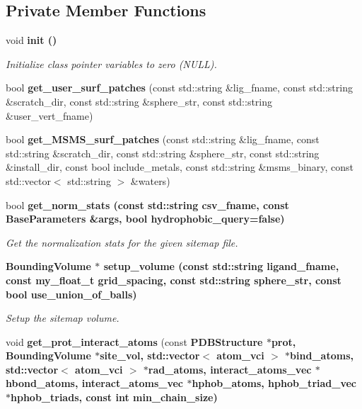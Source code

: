 \subsection*{Private Member Functions}
\begin{CompactItemize}
\item 
void \bf{init} ()\label{classSimSite3D_1_1Sitemap_2c579b022413645a8ecbdc4317117563}

\begin{CompactList}\small\item\em Initialize class pointer variables to zero (NULL). \item\end{CompactList}\item 
bool \textbf{get\_\-user\_\-surf\_\-patches} (const std::string \&lig\_\-fname, const std::string \&scratch\_\-dir, const std::string \&sphere\_\-str, const std::string \&user\_\-vert\_\-fname)\label{classSimSite3D_1_1Sitemap_bc73bf05cc0b7795b178657d537ab7d9}

\item 
bool \textbf{get\_\-MSMS\_\-surf\_\-patches} (const std::string \&lig\_\-fname, const std::string \&scratch\_\-dir, const std::string \&sphere\_\-str, const std::string \&install\_\-dir, const bool include\_\-metals, const std::string \&msms\_\-binary, const std::vector$<$ std::string $>$ \&waters)\label{classSimSite3D_1_1Sitemap_a35e5cc0fa7e11df3b9f5f237a01ab5c}

\item 
bool \bf{get\_\-norm\_\-stats} (const std::string csv\_\-fname, const \bf{Base\-Parameters} \&args, bool hydrophobic\_\-query=false)\label{classSimSite3D_1_1Sitemap_d692fc3eae9705af5c3b5151a18aad82}

\begin{CompactList}\small\item\em Get the normalization stats for the given sitemap file. \item\end{CompactList}\item 
\bf{Bounding\-Volume} $\ast$ \bf{setup\_\-volume} (const std::string ligand\_\-fname, const my\_\-float\_\-t grid\_\-spacing, const std::string sphere\_\-str, const bool use\_\-union\_\-of\_\-balls)
\begin{CompactList}\small\item\em Setup the sitemap volume. \item\end{CompactList}\item 
void \textbf{get\_\-prot\_\-interact\_\-atoms} (const \bf{PDBStructure} $\ast$prot, \bf{Bounding\-Volume} $\ast$site\_\-vol, std::vector$<$ atom\_\-vci $>$ $\ast$bind\_\-atoms, std::vector$<$ atom\_\-vci $>$ $\ast$rad\_\-atoms, interact\_\-atoms\_\-vec $\ast$hbond\_\-atoms, interact\_\-atoms\_\-vec $\ast$hphob\_\-atoms, hphob\_\-triad\_\-vec $\ast$hphob\_\-triads, const int min\_\-chain\_\-size)\label{classSimSite3D_1_1Sitemap_b38affd80a93bb4445f22c732b79e8cb}


\end{CompactItemize}
